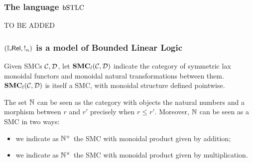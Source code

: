 
\subsubsection{The language $\mathsf b\mathrm{STLC}$}
TO BE ADDED




\subsubsection{$(\mathbb{L} \mathsf{Rel}, !_{n})$ is a model of Bounded Linear Logic}

Given SMCs $\mathcal{C},\mathcal{D}$,  let $\mathbf{SMC}_{l}(\mathcal{C}, \mathcal{D})$ indicate the category of symmetric lax monoidal functors and monoidal natural transformations between them.
$\mathbf{SMC}_{l}(\mathcal{C}, \mathcal{D})$  is itself a SMC, with monoidal structure defined pointwise.

The set 
$\mathbb{N}$ can be seen as the category with objects the natural numbers and a morphism between $r$ and $r'$ precisely when $r\leq r'$. 
Moreover, $\mathbb{N}$ can be seen as a SMC in two ways:
\begin{itemize}

\item we indicate as $\mathbb{N}^{+}$ the SMC with monoidal product given by addition;
\item we indicate as $\mathbb{N}^{\times}$ the SMC with monoidal product given by multiplication.
\end{itemize}



